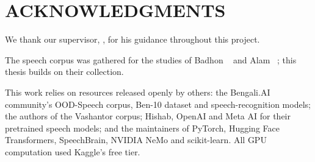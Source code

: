 \chapter*{ACKNOWLEDGMENTS}

We thank our supervisor, \thesissupervisor, for his guidance throughout this
project.

The speech corpus was gathered for the studies of Badhon \etal~\cite{Badhon2020Bengali} and
Alam \etal~\cite{Alam2023Bangla}; this thesis builds on their collection.

This work relies on resources released openly by others: the Bengali.AI
community's OOD-Speech corpus, Ben-10 dataset and speech-recognition models;
the authors of the Vashantor corpus; Hishab, OpenAI and Meta AI for their
pretrained speech models; and the maintainers of PyTorch, Hugging Face
Transformers, SpeechBrain, NVIDIA NeMo and scikit-learn. All GPU computation
used Kaggle's free tier.
